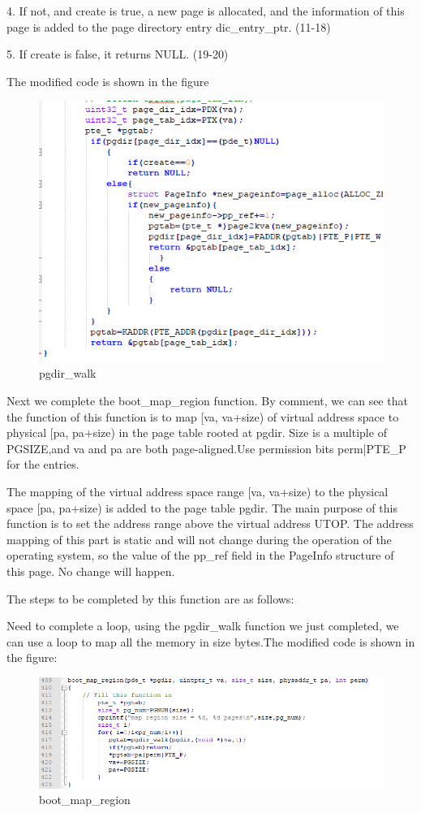 4. If not, and create is true, a new page is allocated, and the information of this page is added to the page directory entry dic\_entry\_ptr. (11-18)

5. If create is false, it returns NULL. (19-20)

The modified code is shown in the figure
\begin{figure}[H]
\centering
\includegraphics[width=0.8\linewidth]{figure/pgdir_walk_changed}
\caption{pgdir\_walk}
\end{figure}

Next we complete the boot\_map\_region function. By comment, we can see that the function of this function is to map [va, va+size) of virtual address space to physical [pa, pa+size) in the page table rooted at pgdir.  Size is a multiple of PGSIZE,and va and pa are both page-aligned.Use permission bits perm|PTE\_P for the entries.


The mapping of the virtual address space range [va, va+size) to the physical space [pa, pa+size) is added to the page table pgdir. The main purpose of this function is to set the address range above the virtual address UTOP. The address mapping of this part is static and will not change during the operation of the operating system, so the value of the pp\_ref field in the PageInfo structure of this page. No change will happen.

The steps to be completed by this function are as follows:

Need to complete a loop, using the pgdir\_walk function we just completed, we can use a loop to map all the memory in size bytes.The modified code is shown in the figure:
\begin{figure}[H]
\centering
\includegraphics[width=0.8\linewidth]{figure/boot_map_region_changed}
\caption{boot\_map\_region}
\end{figure}

